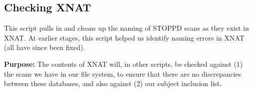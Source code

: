 \documentclass[]{article}
\newenvironment{Shaded}{\begin{snugshade}}{\end{snugshade}}
\newcommand{\KeywordTok}[1]{\textcolor[rgb]{0.13,0.29,0.53}{\textbf{#1}}}
\newcommand{\DataTypeTok}[1]{\textcolor[rgb]{0.13,0.29,0.53}{#1}}
\newcommand{\StringTok}[1]{\textcolor[rgb]{0.31,0.60,0.02}{#1}}
\newcommand{\CommentTok}[1]{\textcolor[rgb]{0.56,0.35,0.01}{\textit{#1}}}
\newcommand{\OtherTok}[1]{\textcolor[rgb]{0.56,0.35,0.01}{#1}}
\newcommand{\OperatorTok}[1]{\textcolor[rgb]{0.81,0.36,0.00}{\textbf{#1}}}
\newcommand{\NormalTok}[1]{#1}
\theoremstyle{definition}
\theoremstyle{definition}
\theoremstyle{definition}
\theoremstyle{remark}
\begin{document}
\begin{Shaded}
\end{Shaded}

\subsection{Checking XNAT}\label{checking-xnat}

This script pulls in and cleans up the naming of STOPPD scans as they
exist in XNAT. At earlier stages, this script helped us identify naming
errors in XNAT (all have since been fixed).

\textbf{Purpose:} The contents of XNAT will, in other scripts, be
checked against (1) the scans we have in our file system, to ensure that
there are no discrepancies between these databases, and also against (2)
our subject inclusion list.
\end{document}
